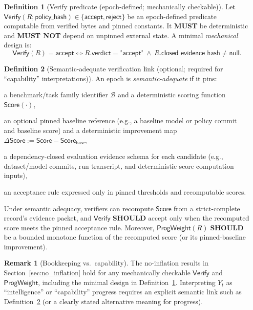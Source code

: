 \documentclass[11pt]{article}
\newcommand{\MUST}{\textbf{MUST}}
\newcommand{\MUSTNOT}{\textbf{MUST NOT}}
\newcommand{\SHOULD}{\textbf{SHOULD}}
\newcommand{\term}[1]{\emph{#1}}
\newcommand{\1}{\mathbf{1}}
\theoremstyle{definition}
\newtheorem{definition}{Definition}
\newtheorem{remark}{Remark}
\theoremstyle{plain}
\begin{document}
\begin{definition}[Verify predicate (epoch-defined; mechanically checkable)]
\label{def:verify_pred}
Let $\mathsf{Verify}(R;\textsf{policy\_hash})\in\{\textsf{accept},\textsf{reject}\}$ be an epoch-defined predicate computable from verified bytes and pinned constants.
It \MUST{} be deterministic and \MUSTNOT{} depend on unpinned external state.
A minimal \emph{mechanical} design is:
\[
\mathsf{Verify}(R)=\textsf{accept}\iff R.\textsf{verdict}=\textsf{"accept"}\ \wedge\ R.\textsf{closed\_evidence\_hash}\neq \textsf{null}.
\]
\end{definition}

\begin{definition}[Semantic-adequate verification link (optional; required for ``capability'' interpretations)]
\label{def:semantic_adequacy}
An epoch is \term{semantic-adequate} if it pins:
\begin{tightitemize}
\item a benchmark/task family identifier $\mathcal{B}$ and a deterministic scoring function $\mathsf{Score}(\cdot)$,
\item an optional pinned baseline reference (e.g., a baseline model or policy commit and baseline score) and a deterministic improvement map $\Delta\mathsf{Score}:=\mathsf{Score}-\mathsf{Score}_{\textsf{base}}$,
\item a dependency-closed evaluation evidence schema for each candidate (e.g., dataset/model commits, run transcript, and deterministic score computation inputs),
\item an acceptance rule expressed only in pinned thresholds and recomputable scores.
\end{tightitemize}
Under semantic adequacy, verifiers can recompute $\mathsf{Score}$ from a strict-complete record's evidence packet, and $\mathsf{Verify}$ \SHOULD{} accept only when the recomputed score meets the pinned acceptance rule.
Moreover, $\mathsf{ProgWeight}(R)$ \SHOULD{} be a bounded monotone function of the recomputed score (or its pinned-baseline improvement).
\end{definition}

\begin{remark}[Bookkeeping vs.\ capability]
The no-inflation results in Section~\ref{sec:no_inflation} hold for any mechanically checkable $\mathsf{Verify}$ and $\mathsf{ProgWeight}$, including the minimal design in Definition~\ref{def:verify_pred}.
Interpreting $Y_t$ as ``intelligence'' or ``capability'' progress requires an explicit semantic link such as Definition~\ref{def:semantic_adequacy} (or a clearly stated alternative meaning for progress).
\end{remark}
\end{document}
